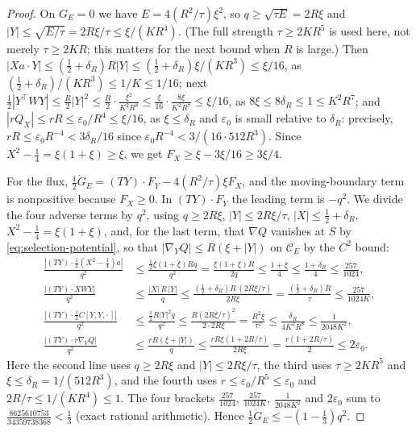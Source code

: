 \begin{proof}
On $G_E=0$ we have $E=4(R^2/\tau)\xi^2$, so $q\ge\sqrt{\tau E}=2R\xi$ and $|Y|\le\sqrt{E/\tau}=2R\xi/\tau\le\xi/(KR^4)$. (The full strength $\tau\ge2KR^5$ is used here, not merely $\tau\ge2KR$; this matters for the next bound when $R$ is large.) Then $|Xa\cdot Y|\le(\frac12+\delta_R)R|Y|\le(\frac12+\delta_R)\xi/(KR^3)\le\xi/16$, as $(\frac12+\delta_R)/(KR^3)\le1/K\le1/16$; next $\frac12|Y^{\top}WY|\le\frac R2|Y|^2\le\frac R2\cdot\frac{\xi^2}{K^2R^8}\le\frac\xi{16}\cdot\frac{8\xi}{K^2R^7}\le\xi/16$, as $8\xi\le8\delta_R\le1\le K^2R^7$; and $|rQ_X|\le rR\le\varepsilon_0/R^4\le\xi/16$, as $\xi\le\delta_R$ and $\varepsilon_0$ is small relative to $\delta_R$: precisely, $rR\le\varepsilon_0R^{-4}<3\delta_R/16$ since $\varepsilon_0R^{-4}<3/(16\cdot512R^3)$. Since $X^2-\frac14=\xi(1+\xi)\ge\xi$, we get $F_X\ge\xi-3\xi/16\ge3\xi/4$.

For the flux, $\frac12\dot G_E=(TY)\cdot F_Y-4(R^2/\tau)\xi F_X$, and the moving-boundary term is nonpositive because $F_X\ge0$. In $(TY)\cdot F_Y$ the leading term is $-q^2$. We divide the four adverse terms by $q^2$, using $q\ge2R\xi$, $|Y|\le2R\xi/\tau$, $|X|\le\frac12+\delta_R$, $X^2-\frac14=\xi(1+\xi)$, and, for the last term, that $\nabla Q$ vanishes at $S$ by \eqref{eq:selection-potential}, so that $|\nabla_YQ|\le R(\xi+|Y|)$ on $\mathcal C_E$ by the $C^2$ bound:
\begin{equation}\label{eq:selection-coneledger}
\begin{aligned}
\frac{|(TY)\cdot\frac12(X^2-\frac14)a|}{q^2}&\le\frac{\frac12\xi(1+\xi)Rq}{q^2}=\frac{\xi(1+\xi)R}{2q}\le\frac{1+\xi}4\le\frac{1+\delta_R}4\le\frac{257}{1024},\\
\frac{|(TY)\cdot XWY|}{q^2}&\le\frac{|X|\,R\,|Y|}q\le\frac{(\frac12+\delta_R)R\,(2R\xi/\tau)}{2R\xi}=\frac{(\frac12+\delta_R)R}\tau\le\frac{257}{1024K},\\
\frac{|(TY)\cdot\frac12C[Y,Y,\cdot\,]|}{q^2}&\le\frac{\frac12R|Y|^2q}{q^2}\le\frac{R(2R\xi/\tau)^2}{2\cdot2R\xi}=\frac{R^2\xi}{\tau^2}\le\frac{\delta_R}{4K^2R^8}\le\frac1{2048K^2},\\
\frac{|(TY)\cdot r\nabla_YQ|}{q^2}&\le\frac{rR(\xi+|Y|)}q\le\frac{rR\xi(1+2R/\tau)}{2R\xi}=\frac{r(1+2R/\tau)}2\le2\varepsilon_0 .
\end{aligned}
\end{equation}
Here the second line uses $q\ge2R\xi$ and $|Y|\le2R\xi/\tau$, the third uses $\tau\ge2KR^5$ and $\xi\le\delta_R=1/(512R^3)$, and the fourth uses $r\le\varepsilon_0/R^5\le\varepsilon_0$ and $2R/\tau\le1/(KR^4)\le1$. The four brackets $\frac{257}{1024}$, $\frac{257}{1024K}$, $\frac1{2048K^2}$ and $2\varepsilon_0$ sum to $\frac{8625610753}{34359738368}<\frac13$ (exact rational arithmetic). Hence $\frac12\dot G_E\le-(1-\frac13)q^2$.
\end{proof}

